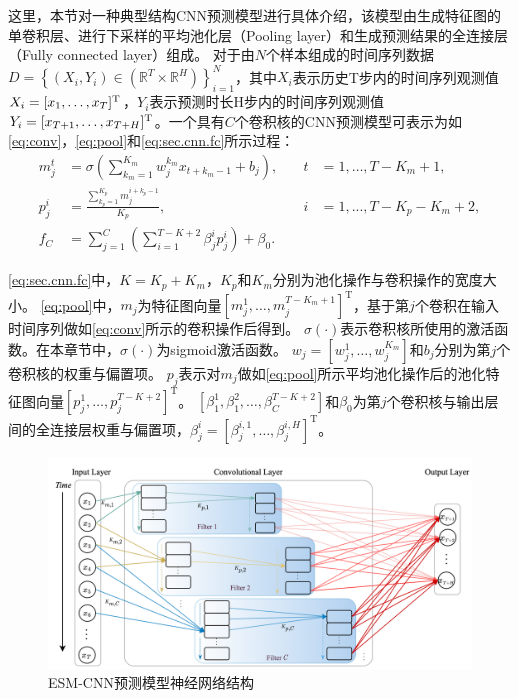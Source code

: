 这里，本节对一种典型结构CNN预测模型进行具体介绍，该模型由生成特征图的单卷积层、进行下采样的平均池化层（Pooling layer）和生成预测结果的全连接层（Fully connected layer）组成。
对于由$N$个样本组成的时间序列数据$D=\left\{\left(X_{i}, Y_{i}\right) \in\left(\mathbb{R}^{T} \times \mathbb{R}^{H}\right)\right\}_{i=1}^{N}$，其中$X_i$表示历史T步内的时间序列观测值$X_i = [x_1,\dots, x_T]^{\operatorname{{\mathrm{T}}}}$，$Y_i$表示预测时长H步内的时间序列观测值$Y_i = [x_{T+1},\dots, x_{T+H}]^{\operatorname{{\mathrm{T}}}}$。一个具有$C$个卷积核的CNN预测模型可表示为如\autoref{eq:conv}，\autoref{eq:pool}和\autoref{eq:sec.cnn.fc}所示过程：
\begin{align}
    m_j^t &= \sigma \left(\sum^{K_m}_{k_m=1} w^{k_m}_j x_{t+k_m-1} +b_j\right), \quad &t &= 1,\dots, T-K_m +1, \label{eq:conv}  \\
    p_j^i &= \frac{\sum^{K_p}_{k_p=1} m_j^{i+k_p-1}}{K_p}, \quad &i &= 1,..., T-K_p - K_m+2, \label{eq:pool} \\
    f_C &= \sum^C_{j=1} \left( \sum^{T-K+2}_{i=1}\beta_{j}^i p_j^i\right) + \beta_0.& & \label{eq:sec.cnn.fc}
\end{align}

\autoref{eq:sec.cnn.fc}中，$K = K_p + K_m$，$K_p$和$K_m$分别为池化操作与卷积操作的宽度大小。
\autoref{eq:pool}中，${m}_j$为特征图向量$[m_j^1, \ldots, m^{T-{K_m}+1}_j]^{\mathrm{T}}$，基于第$j$个卷积在输入时间序列做如\autoref{eq:conv}所示的卷积操作后得到。
$\sigma(\cdot)$表示卷积核所使用的激活函数。在本章节中，$\sigma(\cdot)$为sigmoid激活函数。
${w_j} = [w_j^1,\ldots, w_j^{K_m}]$和$b_j$分别为第$j$个卷积核的权重与偏置项。
$p_j$表示对${m}_j$做如\autoref{eq:pool}所示平均池化操作后的池化特征图向量$[p_j^1, \ldots, p^{T-{K}+2}_j]^{\mathrm{T}}$。
$[\beta_1^1, \beta_1^2,\ldots,\beta_C^{T-K+2}]$和$\beta_0$为第$j$个卷积核与输出层间的全连接层权重与偏置项，$\beta_j^i = [\beta_{j}^{i,1},\ldots,\beta_{j}^{i,H}]^{\mathrm{T}}$。

\begin{figure}[!t]
    \centering
    \includegraphics[width = \textwidth]{float/ch.cnn/esm-cnn.png}
    \caption{\label{fig:esm_arch} ESM-CNN预测模型神经网络结构}
\end{figure}

